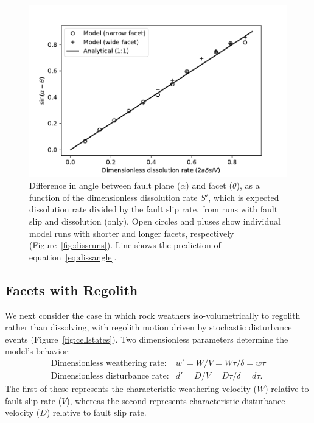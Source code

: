 \begin{figure}[ht!]
\centerline{\includegraphics{figure8.pdf}}
\caption{Difference in angle between fault plane ($\alpha$) and facet ($\theta$), as a function of the dimensionless dissolution rate $S'$, which is expected dissolution rate divided by the fault slip rate, from runs with fault slip and dissolution (only). Open circles and pluses show individual model runs with shorter and longer facets, respectively (Figure~\ref{fig:dissruns}). Line shows the prediction of equation~\ref{eq:dissangle}.}
\label{fig:angdiss}
\end{figure}

\subsection{Facets with Regolith}

We next consider the case in which rock weathers iso-volumetrically to regolith rather than dissolving, with regolith motion driven by stochastic disturbance events (Figure~\ref{fig:cellstates}). Two dimensionless parameters determine the model's behavior:
\begin{eqnarray*}
\textrm{Dimensionless weathering rate:} & w' = W/V = W\tau/\delta = w\tau \\
\textrm{Dimensionless disturbance rate:} & d' = D/V = D\tau/\delta = d\tau.
\end{eqnarray*}
The first of these represents the characteristic weathering velocity ($W$) relative to fault slip rate ($V$), whereas the second represents characteristic disturbance velocity ($D$) relative to fault slip rate.

